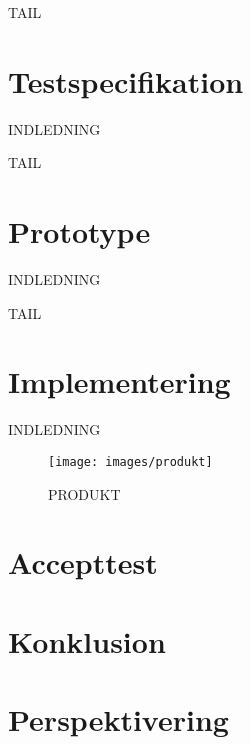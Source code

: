 







\begin{tail}
TAIL
\end{tail}

\chapter{Testspecifikation}
\label{cha:testspecifikation}
\begin{indledning}
INDLEDNING
\end{indledning}

\begin{tail}
TAIL
\end{tail}


\chapter{Prototype}
\label{cha:prototype}
\begin{indledning}
INDLEDNING
\end{indledning}


\begin{tail}
  TAIL
\end{tail}

\chapter{Implementering}
\label{cha:implementering}

\begin{indledning}
  INDLEDNING
\end{indledning}

\begin{figure}[htbp]
  \centering
  \texttt{[image: images/produkt]}
  \caption{PRODUKT}
  \label{fig:produkt}
\end{figure}


\chapter{Accepttest}
\label{cha:accepttest}


\chapter{Konklusion}
\label{cha:konklusion}



\chapter{Perspektivering}
\label{cha:perspektivering}


\appendix


% 






